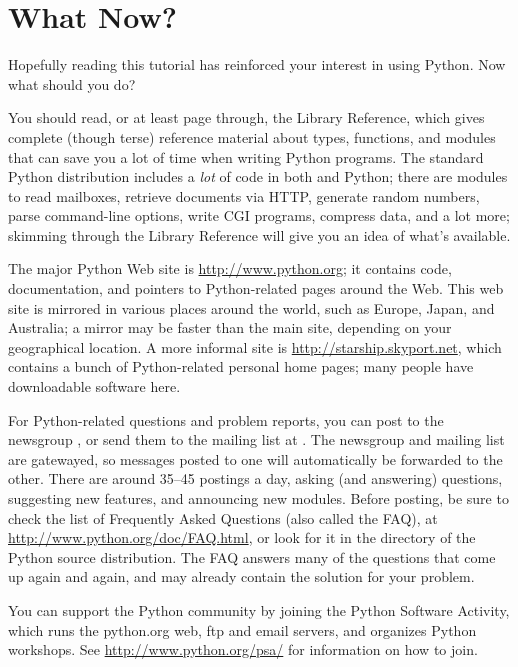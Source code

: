 \documentclass{manual}
\begin{document}
\chapter{What Now?}
\label{whatNow}

Hopefully reading this tutorial has reinforced your interest in using
Python.  Now what should you do?

You should read, or at least page through, the Library Reference,
which gives complete (though terse) reference material about types,
functions, and modules that can save you a lot of time when writing
Python programs.  The standard Python distribution includes a
\emph{lot} of code in both \C{} and Python; there are modules to read
\UNIX{} mailboxes, retrieve documents via HTTP, generate random
numbers, parse command-line options, write CGI programs, compress
data, and a lot more; skimming through the Library Reference will give
you an idea of what's available.

The major Python Web site is \url{http://www.python.org}; it contains
code, documentation, and pointers to Python-related pages around the
Web.  This web site is mirrored in various places around the
world, such as Europe, Japan, and Australia; a mirror may be faster
than the main site, depending on your geographical location.  A more
informal site is \url{http://starship.skyport.net}, which contains a
bunch of Python-related personal home pages; many people have
downloadable software here.

For Python-related questions and problem reports, you can post to the
newsgroup , or send them to the mailing
list at .  The newsgroup and mailing list
are gatewayed, so messages posted to one will automatically be
forwarded to the other.  There are around 35--45 postings a day,
asking (and answering) questions, suggesting new features, and
announcing new modules.  Before posting, be sure to check the list of
Frequently Asked Questions (also called the FAQ), at
\url{http://www.python.org/doc/FAQ.html}, or look for it in the
 directory of the Python source distribution.  The FAQ
answers many of the questions that come up again and again, and may
already contain the solution for your problem.

You can support the Python community by joining the Python Software
Activity, which runs the python.org web, ftp and email servers, and
organizes Python workshops.  See \url{http://www.python.org/psa/} for
information on how to join.
\end{document}
